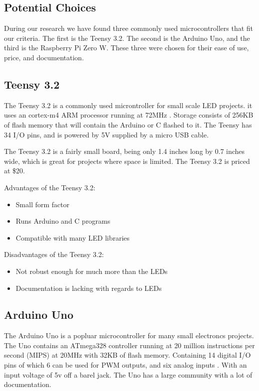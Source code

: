 \documentclass[onecolumn, draftclsnofoot,10pt, compsoc]{IEEEtran}
\begin{document}
		\subsection{Potential Choices}
		During our research we have found three commonly used microcontrollers that
		fit our criteria. The first is the Teensy 3.2. The second is the Arduino Uno,
		and the third is the Raspberry Pi Zero W. These three were chosen for their
		ease of use, price, and documentation.
		\subsection{Teensy 3.2}
		The Teensy 3.2 is a commonly used microntroller for small scale LED projects.
		it uses an cortex-m4 ARM processor running at 72MHz \cite[Pg 2]{K20}. Storage consists
		of 256KB of flash memory that will contain the Arduino or C flashed to it.
		The Teensy has 34 I/O pins, and is powered by 5V supplied by a micro USB
		cable.

		\vspace{5mm}
		\noindent The Teensy 3.2 is a fairly small board, being only 1.4 inches long
		by 0.7 inches wide, which is great for projects where space is limited. The
		Teensy 3.2 is priced at \$20.

		\vspace{5mm}
		\noindent Advantages of the Teensy 3.2:
		\begin{itemize}
			\item Small form factor
			\item Runs Arduino and C programs
			\item Compatible with many LED libraries
		\end{itemize}
		Disadvantages of the Teensy 3.2:
		\begin{itemize}
			\item Not robust enough for much more than the LEDs
			\item Documentation is lacking with regards to LEDs
		\end{itemize}
		\subsection{Arduino Uno}

		\vspace{5mm}
		\noindent The Arduino Uno is a popluar microcontroller for many small electroncs
		projects. The Uno contains an ATmega328 controller running at 20 million
		instructions per second (MIPS) at 20MHz with 32KB of flash
		memory\cite[Pg 2]{atmel}. Containing 14 digital I/O pins of which 6
		can be used for PWM outputs, and six analog inputs \cite[Pg 2]{arduino}. With
		an input voltage of 5v off a barel jack. The Uno has a large community with
		a lot of documentation.
\end{document}
